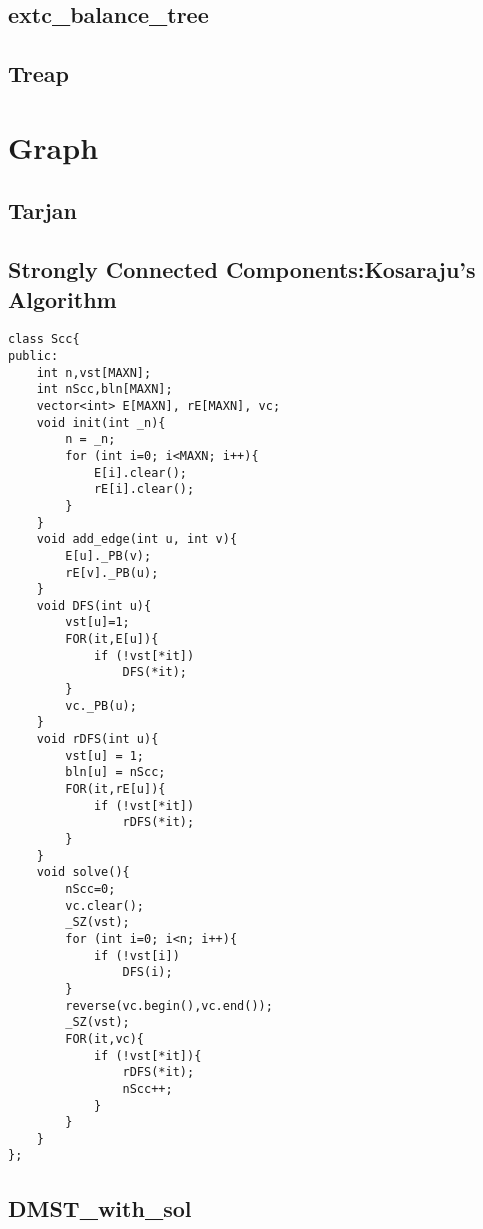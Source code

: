 \documentclass[10pt,twocolumn,oneside]{article}
\begin{document}
\subsection{extc\_balance\_tree}


\subsection{Treap}


\section{Graph}

\subsection{Tarjan}


\subsection{Strongly Connected Components:Kosaraju's Algorithm}
\begin{lstlisting}
class Scc{
public:
	int n,vst[MAXN];
	int nScc,bln[MAXN];
	vector<int> E[MAXN], rE[MAXN], vc;
	void init(int _n){
		n = _n;
		for (int i=0; i<MAXN; i++){
			E[i].clear();
			rE[i].clear();
		}
	}
	void add_edge(int u, int v){
		E[u]._PB(v);
		rE[v]._PB(u);
	}
	void DFS(int u){
		vst[u]=1;
		FOR(it,E[u]){
			if (!vst[*it])
				DFS(*it);
		}
		vc._PB(u);
	}
	void rDFS(int u){
		vst[u] = 1;
		bln[u] = nScc;
		FOR(it,rE[u]){
			if (!vst[*it])
				rDFS(*it);
		}
	}
	void solve(){
		nScc=0;
		vc.clear();
		_SZ(vst);
		for (int i=0; i<n; i++){
			if (!vst[i])
				DFS(i);
		}
		reverse(vc.begin(),vc.end());
		_SZ(vst);
		FOR(it,vc){
			if (!vst[*it]){
				rDFS(*it);
				nScc++;
			}
		}
	}
};
\end{lstlisting}

%

\subsection{DMST\_with\_sol}

\end{document}

